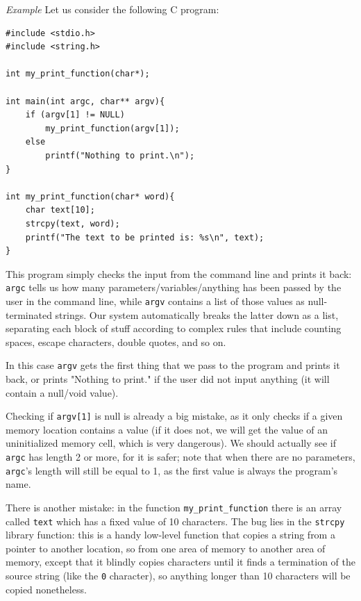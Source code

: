 \vspace{0.5em}

\emph{Example} Let us consider the following C program:

\begin{verbatim}
#include <stdio.h>
#include <string.h>

int my_print_function(char*);

int main(int argc, char** argv){
    if (argv[1] != NULL)
        my_print_function(argv[1]);
    else
        printf("Nothing to print.\n");
}

int my_print_function(char* word){
    char text[10];
    strcpy(text, word);
    printf("The text to be printed is: %s\n", text);
}
\end{verbatim}
 
This program simply checks the input from the command line and prints it back: \texttt{argc} tells us how many parameters/variables/anything has been passed by the user in the command line, while \texttt{argv} contains a list of those values as null-terminated strings. Our system automatically breaks the latter down as a list, separating each block of stuff according to complex rules that include counting spaces, escape characters, double quotes, and so on.

In this case \texttt{argv} gets the first thing that we pass to the program and prints it back, or prints "Nothing to print." if the user did not input anything (it will contain a null/void value).

Checking if \texttt{argv[1]} is null is already a big mistake, as it only checks if a given memory location contains a value (if it does not, we will get the value of an uninitialized memory cell, which is very dangerous). We should actually see if \texttt{argc} has length 2 or more, for it is safer; note that when there are no parameters, \texttt{argc}’s length will still be equal to 1, as the first value is always the program’s name.

There is another mistake: in the function \texttt{my\_print\_function} there is an array called \texttt{text} which has a fixed value of 10 characters. The bug lies in the \texttt{strcpy} library function: this is a handy low-level function that copies a string from a pointer to another location, so from one area of memory to another area of memory, except that it blindly copies characters until it finds a termination of the source string (like the \texttt{0} character), so anything longer than 10 characters will be copied nonetheless.

